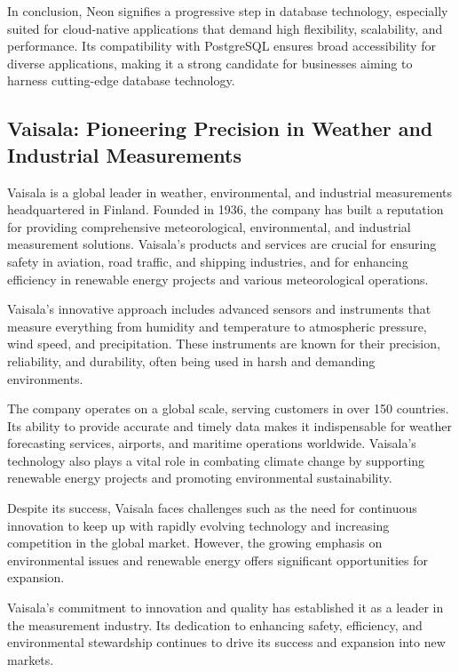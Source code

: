 In conclusion, Neon signifies a progressive step in database technology,
especially suited for cloud-native applications that demand high flexibility,
scalability, and performance. Its compatibility with PostgreSQL ensures broad
accessibility for diverse applications, making it a strong candidate for
businesses aiming to harness cutting-edge database technology.

\subsection{Vaisala: Pioneering Precision in Weather and Industrial Measurements}

Vaisala is a global leader in weather, environmental, and industrial
measurements headquartered in Finland. Founded in 1936, the company has built a
reputation for providing comprehensive meteorological, environmental, and
industrial measurement solutions. Vaisala's products and services are crucial
for ensuring safety in aviation, road traffic, and shipping industries, and for
enhancing efficiency in renewable energy projects and various meteorological
operations.

Vaisala's innovative approach includes advanced sensors and instruments that
measure everything from humidity and temperature to atmospheric pressure, wind
speed, and precipitation. These instruments are known for their precision,
reliability, and durability, often being used in harsh and demanding
environments.

The company operates on a global scale, serving customers in over 150 countries.
Its ability to provide accurate and timely data makes it indispensable for
weather forecasting services, airports, and maritime operations worldwide.
Vaisala's technology also plays a vital role in combating climate change by
supporting renewable energy projects and promoting environmental sustainability.

Despite its success, Vaisala faces challenges such as the need for continuous
innovation to keep up with rapidly evolving technology and increasing
competition in the global market. However, the growing emphasis on environmental
issues and renewable energy offers significant opportunities for expansion.

Vaisala's commitment to innovation and quality has established it as a leader in
the measurement industry. Its dedication to enhancing safety, efficiency, and
environmental stewardship continues to drive its success and expansion into new
markets.

